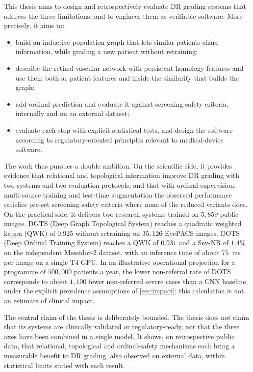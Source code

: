 This thesis aims to design and retrospectively evaluate DR grading systems that address
the three limitations, and to engineer them as verifiable software. More precisely, it
aims to:
\begin{itemize}[leftmargin=1.4em,itemsep=3pt]
\item build an inductive population graph that lets similar patients share information,
while grading a new patient without retraining;
\item describe the retinal vascular network with persistent-homology features and use them
both as patient features and inside the similarity that builds the graph;
\item add ordinal prediction and evaluate it against screening safety criteria, internally
and on an external dataset;
\item evaluate each step with explicit statistical tests, and design the software according
to regulatory-oriented principles relevant to medical-device software.
\end{itemize}

The work thus pursues a double ambition. On the scientific side, it provides evidence that relational and topological information
improve DR grading with two systems and two evaluation protocols, and that with ordinal supervision,
multi-source training and test-time augmentation the observed performance satisfies
pre-set screening safety criteria where none of the reduced variants does. On the practical
side, it delivers two research systems trained on $5{,}859$ public images. DGTS (Deep Graph
Topological System) reaches a quadratic weighted kappa (QWK) of $0.925$ without retraining on
$35{,}126$ EyePACS images. DOTS (Deep Ordinal Training System) reaches a QWK of $0.931$
and a Sev-NR of $1.4\%$ on the independent Messidor-2 dataset, with an inference time of
about $75$~ms per image on a single T4 GPU. In an illustrative
operational projection for a programme of $500{,}000$ patients a year, the lower
non-referral rate of DOTS corresponds to about $1{,}100$ fewer non-referred severe cases
than a CNN baseline, under the explicit prevalence assumptions of \cref{sec:impact}; this
calculation is not an estimate of clinical impact.

The central claim of the thesis is deliberately bounded. The thesis does not claim that
its systems are clinically validated or regulatory-ready, nor that the three axes have
been combined in a single model. It shows, on retrospective public data, that
relational, topological and ordinal-safety mechanisms each bring a measurable benefit to
DR grading, also observed on external data, within statistical limits stated with each
result.

